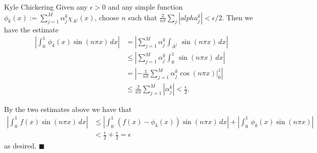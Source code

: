 \begin{solution}{Kyle Chickering}
	Given any $\epsilon > 0$ and any simple function $\phi_k(x):=\sum_{j=1}^M\alpha_j^k\chi_{A^j}(x)$, choose $n$ such that $\frac{2}{n\pi}\sum_{j}|alpha_j^k|<\epsilon/2$. Then we have the estimate
	\begin{align*}
		\left|\int_0^1\,\phi_k(x)\sin(n\pi x)\,dx\right| &= \left|\sum_{j=1}^M\alpha_j^k\int_{A^j}\,\sin(n\pi x)\,dx\right| \\
                                                         &\leqslant \left|\sum_{j=1}^M\alpha_j^k\int_0^1\,\sin(n\pi x)\,dx\right| \\
                                                         &=\left|-\frac{1}{n\pi}\sum_{j=1}^M\alpha_j^k\cos(n\pi x)\big|_0^1\right| \\
                                                         &\leqslant \frac{2}{n\pi}\sum_{j=1}^M|\alpha_j^k| < \frac{\epsilon}{2}.
  \end{align*}

  By the two estimates above we have that
  \begin{align*}
    \left|\int_{0}^1\,f(x)\sin(n\pi x)\,dx\right| &\leqslant \left|\int_0^1\,(f(x)-\phi_k(x))\sin(n\pi x)\,dx\right| + \left|\int_0^1\,\phi_k(x)\sin(n\pi x)\right| \\
                                                  &< \frac{\epsilon}{2} + \frac{\epsilon}{2} = \epsilon
  \end{align*}
  as desired. $\blacksquare$
\end{solution}

